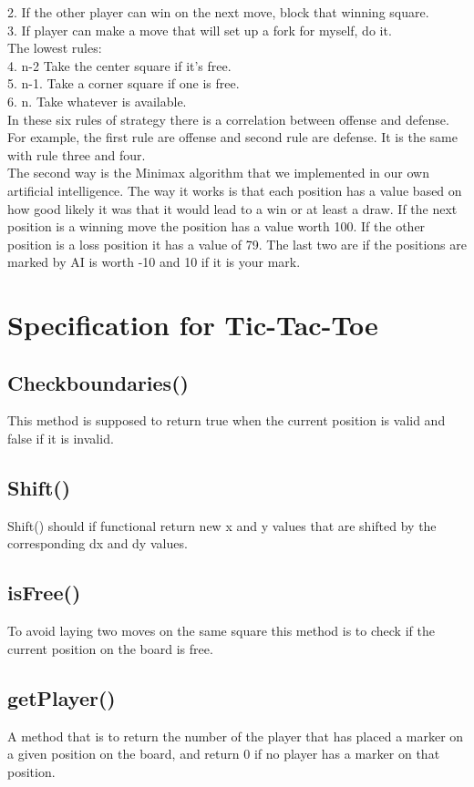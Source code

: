 \documentclass[a4paper,10pt]{article}
\begin{document}
2. If the other player can win on the next move, block that winning square.\\
3. If player can make a move that will set up a fork for myself, do it.\\
The lowest rules:\\
4. n-2 Take the center square if it’s free.\\
5. n-1. Take a corner square if one is free. \\
6. n. Take whatever is available.\\
In these six rules of strategy there is a correlation between offense and defense. For example, the first rule are offense and second rule are defense. It is the same with rule three and four. \\
The second way is the Minimax algorithm that we implemented in our own artificial intelligence. The way it works is that each position has a value based on how good likely it was that it would lead to a win or at least a draw. If the next position is a winning move the position has a value worth 100. If the other position is a loss position it has a value of 79. The last two are if the positions are marked by AI is worth -10 and 10 if it is your mark. \\

	
	\section{Specification for Tic-Tac-Toe} 
\subsection{Checkboundaries()}
		This method is supposed to return true when the current position is valid and false if it is invalid.
\subsection{Shift()}
Shift() should if functional return new x and y values that are shifted by the corresponding dx and dy values.
\subsection{isFree()}
To avoid laying two moves on the same square this method is to check if the current position on the board is free.
\subsection{getPlayer()}
A method that is to return the number of the player that has placed a marker on a given position on the board, and return 0 if no player has a marker on that position.
\end{document}
